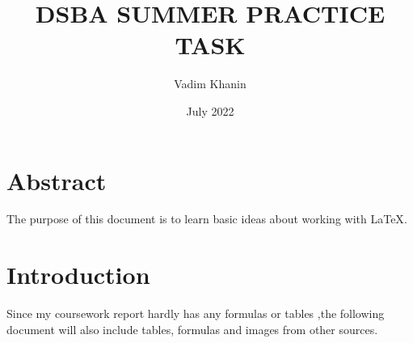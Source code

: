\documentclass[a4paper, 12pt]{article}
\title{DSBA SUMMER PRACTICE TASK}
\author{Vadim Khanin}
\date{July 2022}
\begin{document}
\maketitle
\newpage
\begin{center}
\tableofcontents
\end{center}
\newpage


    
\section{Abstract}

The purpose of this document is to learn basic ideas about working with LaTeX\cite{lamport1985i1}.


\section{Introduction}
Since my coursework report hardly has any formulas or tables ,the following document will also include tables, formulas and images from other sources.
\newpage
\end{document}

